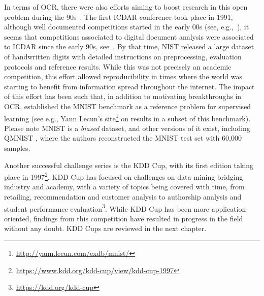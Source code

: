 \documentclass[twoside,11pt]{article}
\begin{document}
In terms of OCR, there were also efforts aiming to boost research in this open problem during the 90s~\citep{mnistreport97}. The first ICDAR conference took place in 1991, although well documented competitions started in the early 00s %
(see, e.g.,~\citep{DBLP:conf/icdar/LucasPSTWY03}), it seems that competitions associated to digital document analysis were associated to ICDAR since the early 90s, see~\citep{DBLP:conf/icdar/MatsuiNYWY93}.  By that time,  NIST released a large dataset of handwritten digits \citep{Grother1995NISTSD} with detailed instructions on preprocessing, evaluation protocols and reference results. While this was not precisely an academic competition, this effort allowed reproducibility in times where the world was starting to benefit from information spread throughout the internet.  The impact of this effort has been such that, in addition to motivating breakthroughs in OCR, established the MNIST benchmark as a reference problem for supervised learning (see e.g., Yann Lecun's site\footnote{\url{http://yann.lecun.com/exdb/mnist/}} on results in a subset of this benchmark).  Please note MNIST is a \emph{biased} dataset, and other versions of it exist, including QMNIST \citep{qmnist-2019}, where the authors reconstructed the MNIST test set with 60,000 samples. 


Another successful challenge series is the KDD Cup, with its first edition taking place in 1997\footnote{\url{https://www.kdd.org/kdd-cup/view/kdd-cup-1997}}. KDD Cup has focused on challenges on data mining bridging industry and academy, with a variety of topics being covered with time, from retailing, recommendation and customer analysis to authorship analysis and student performance evaluation\footnote{\url{https://kdd.org/kdd-cup}}. While KDD Cup %
has been more application-oriented, findings from this competition have resulted in progress in the field without any doubt. KDD Cups are reviewed in the next chapter. 


\end{document}
